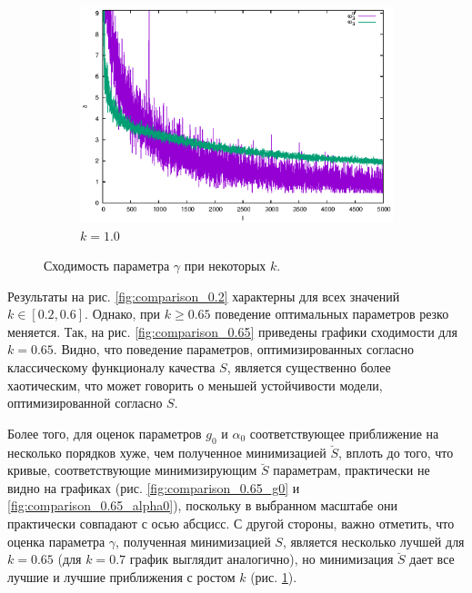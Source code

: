 \documentclass[tikz,10pt,a4paper]{article}
\begin{document}
\begin{figure}[h]
\begin{subfigure}[b]{0.35\textwidth}
    \includegraphics[width=\textwidth]{figs/levmar/comparison/comparison_5000_1000_xsigma1.00_float.txt_parameter3.eps}
	\caption{$k = 1.0$}
  \end{subfigure}
  \caption{Сходимость параметра $\gamma$ при некоторых $k$.}
  \label{fig:comparison_gamma_k}
\end{figure}

Результаты на рис. \ref{fig:comparison_0.2} характерны для всех
значений $k \in [0.2, 0.6]$. Однако, при $k \geq 0.65$ поведение оптимальных
параметров резко меняется. Так, на рис. \ref{fig:comparison_0.65} приведены
графики сходимости для $k = 0.65$. Видно, что поведение параметров,
оптимизированных согласно классическому функционалу качества $S$, является
существенно более хаотическим, что может говорить о меньшей устойчивости
\cite{Rudoy16StabilityAnalysis} модели, оптимизированной согласно $S$.

Более того, для оценок параметров $g_0$ и $\alpha_0$ соответствующее
приближение на несколько порядков хуже, чем полученное минимизацией $\breve{S}$,
вплоть до того, что кривые, соответствующие минимизирующим $\breve{S}$ параметрам,
практически не видно на графиках (рис. \ref{fig:comparison_0.65_g0} и
\ref{fig:comparison_0.65_alpha0}), поскольку в выбранном масштабе они
практически совпадают с осью абсцисс. С другой стороны, важно отметить, что оценка
параметра $\gamma$, полученная минимизацией $S$, является несколько лучшей для
$k = 0.65$ (для $k = 0.7$ график выглядит аналогично), но минимизация $\breve{S}$
дает все лучшие и лучшие приближения с ростом $k$ (рис.
\ref{fig:comparison_gamma_k}).
\end{document}
